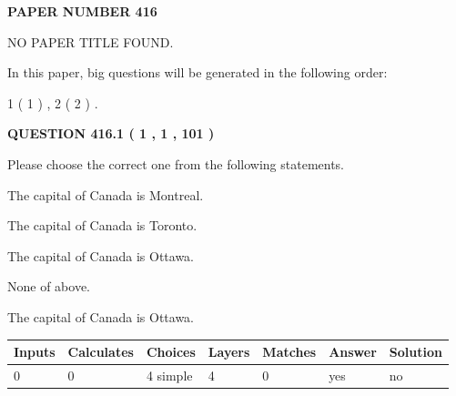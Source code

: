 \documentclass[12pt]{article}
\begin{document}
 
 
   
   
\newpage 
\setcounter{page}{ 
   416001 } 
   
   
   
   
 {\textbf{ \Large{ PAPER NUMBER  416  }}}
   
   
\vspace{0.2in}
   
   
   
   
   
   
 NO PAPER TITLE FOUND.
   
   
   
\vspace{0.2in}
   
In this paper, big questions will be generated in the following order: 
   
   
   1 ( 1 )
 ,
   2 ( 2 )
 .
  
\vspace{0.2in}
  
{\textbf{\Large{QUESTION
416.1 
 ( 1 , 1 , 101 )
}}}
  
  
Please choose the correct one from the following statements.
 
 
The capital of Canada is Montreal.
 
 
The capital of Canada is Toronto.
 
 
The capital of Canada is Ottawa.
 
 
 None of above.
 
 
\noindent{}
 
 
The capital of Canada is Ottawa.
 
 
\noindent{}
 
 
   
   
   
   
\noindent\begin{tabular}{|l|l|l|l|l|l|l|}
 \hline
Inputs & Calculates & Choices & Layers & Matches & Answer & Solution \\ \hline
 0  & 
 0  & 
 4
  simple  
  & 
 4  & 
 0  & 
  yes & 
  no 
  \\ \hline
 \end{tabular}
   
\end{document}
